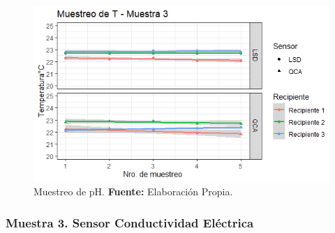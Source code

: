     \begin{figure}[H]
        \centering
        \includegraphics[width=0.75\linewidth]{Imagenes/cap4/T_M3.png}
        \caption {Muestreo de pH. \textbf{Fuente:}
        Elaboraci\'on Propia. }
        \label{fig:M3T}
    \end{figure}

\subsubsection{Muestra 3. Sensor Conductividad El\'ectrica}

